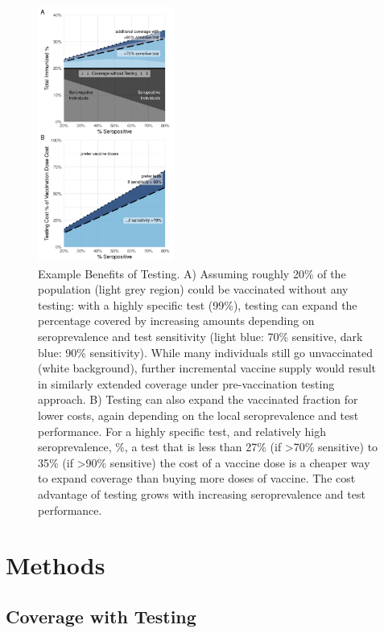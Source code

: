 \documentclass[10pt,a4paper,twocolumn]{article}
\begin{document}
\begin{figure}
\centering
\includegraphics[width=0.4\textwidth]{main.png}
\caption{\label{mainfig}Example Benefits of Testing. A) Assuming roughly 20\% of the population (light grey region) could be vaccinated without any testing: with a highly specific test (99\%), testing can expand the percentage covered by increasing amounts depending on seroprevalence and test sensitivity (light blue: 70\% sensitive, dark blue: 90\% sensitivity). While many individuals still go unvaccinated (white background), further incremental vaccine supply would result in similarly extended coverage under pre-vaccination testing approach. B) Testing can also expand the vaccinated fraction for lower costs, again depending on the local seroprevalence and test performance. For a highly specific test, and relatively high seroprevalence, \%, a test that is less than 27\% (if >70\% sensitive) to 35\% (if >90\% sensitive) the cost of a vaccine dose is a cheaper way to expand coverage than buying more doses of vaccine. The cost advantage of testing grows with increasing seroprevalence and test performance.}
\end{figure}

\section*{Methods}

\subsection*{Coverage with Testing}
\end{document}
